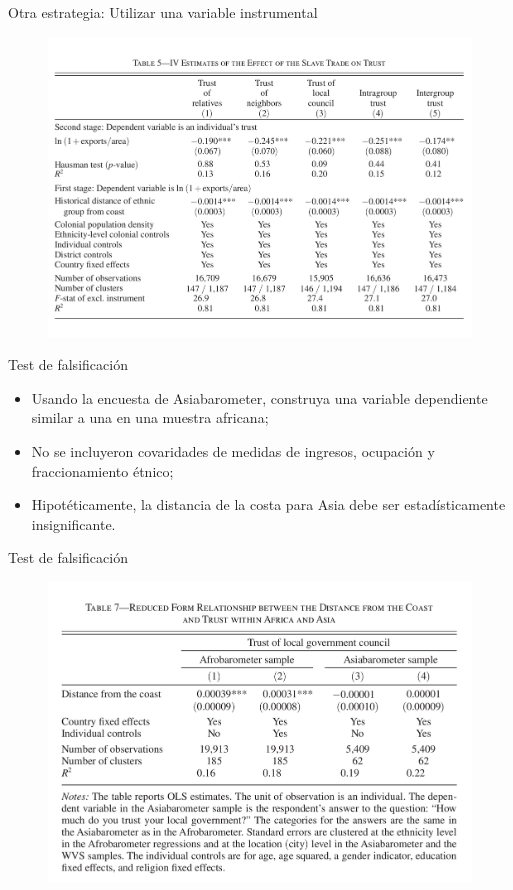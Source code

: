 \documentclass[11pt, aspectratio=169, compress]{beamer}
\begin{document}
\begin{frame}{Otra estrategia: Utilizar una variable instrumental}
	\vspace*{-3ex}
		\begin{figure}[htb]
		\centering
		\includegraphics[width=.8\textwidth]{tab5}
	\end{figure}
\end{frame}
\begin{frame}{Test de falsificación}
	\begin{itemize}
		\item Usando la encuesta de Asiabarometer, construya una variable dependiente similar a una en una muestra africana;
		\item No se incluyeron covaridades de medidas de ingresos, ocupación y fraccionamiento étnico;
		\item Hipotéticamente, la distancia de la costa para Asia debe ser estadísticamente insignificante. 
	\end{itemize}
\end{frame}
\begin{frame}{Test de falsificación}
	\begin{figure}[htb]
		\centering
		\includegraphics[width=.7\textwidth]{tab7}
	\end{figure}
\end{frame}
\end{document}
